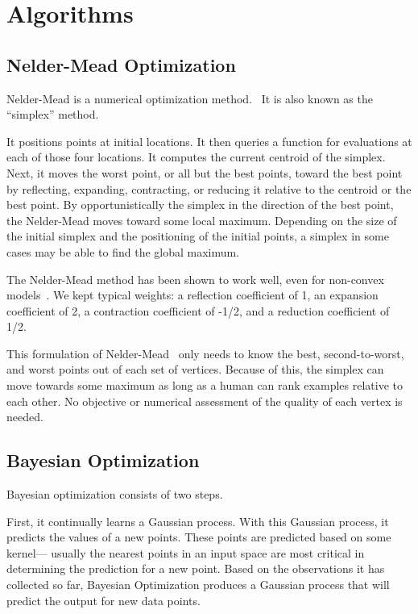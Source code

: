 \section{Algorithms}

\subsection{Nelder-Mead Optimization}

Nelder-Mead is a numerical optimization method.~
It is also known as the ``simplex'' method.

It positions points at initial locations.
It then queries a function for evaluations at each of those four locations.
It computes the current centroid of the simplex.
Next, it moves the worst point, or all but the best points, toward the best point by reflecting, expanding, contracting, or reducing it relative to the centroid or the best point.
By opportunistically the simplex in the direction of the best point, the Nelder-Mead moves toward some local maximum.
Depending on the size of the initial simplex and the positioning of the initial points, a simplex in some cases may be able to find the global maximum.

The Nelder-Mead method has been shown to work well, even for non-convex models~.
We kept typical weights: a reflection coefficient of 1, an expansion coefficient of 2, a contraction coefficient of -1/2, and a reduction coefficient of 1/2.

This formulation of Nelder-Mead~ only needs to know the best, second-to-worst, and worst points out of each set of vertices.
Because of this, the simplex can move towards some maximum as long as a human can rank examples relative to each other.
No objective or numerical assessment of the quality of each vertex is needed.

\subsection{Bayesian Optimization}

Bayesian optimization consists of two steps.

First, it continually learns a Gaussian process.
With this Gaussian process, it predicts the values of a new points.
These points are predicted based on some kernel---
usually the nearest points in an input space are most critical in determining the prediction for a new point.
Based on the observations it has collected so far, Bayesian Optimization produces a Gaussian process that will predict the output for new data points.

